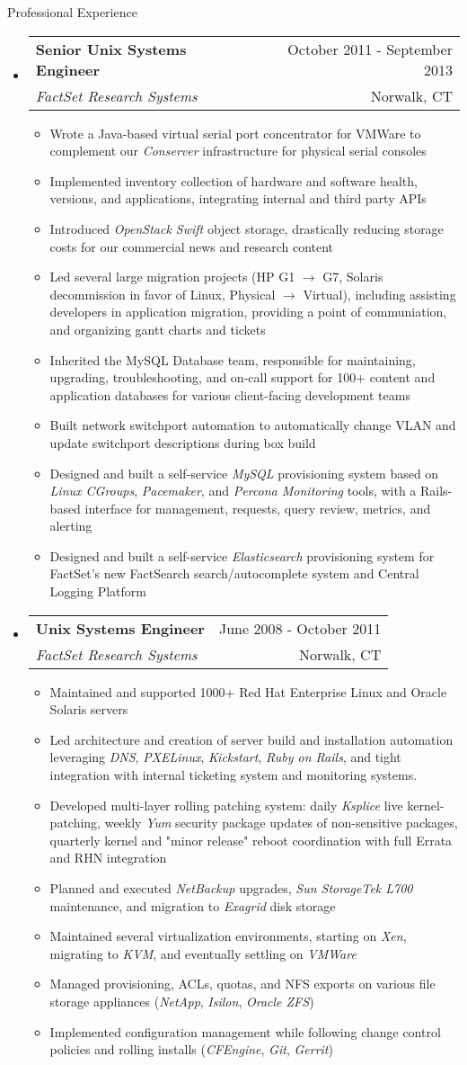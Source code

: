\documentclass[letterpaper,10pt]{article}
\makeatletter
\newenvironment{ressection}[1]{
	\vspace{4pt}
	{\fontfamily{phv}\selectfont\Large#1}
	\begin{itemize}
	\vspace{3pt}
}{
	\end{itemize}
}
\newcommand{\ressubitem}[1]{
	\vspace{-1pt}
	\item \begin{flushleft} #1 \end{flushleft}
}
\newcommand{\resbigitem}[4]{
	\vspace{-5pt}
	\item
	\begin{tabular*}{6in}{l@{\extracolsep{\fill}}r}
		\textbf{#1} & #2 \\
		\textit{#3} & #4\\
	\end{tabular*}
}
\newenvironment{ressubsec}[4]{
	\resbigitem{#1}{#2}{#3}{#4}
	\vspace{-2pt}
	\begin{itemize}
}{
	\end{itemize}
}
\makeatother
\begin{document}
\begin{ressection}{Professional Experience}
	\begin{ressubsec}{Senior Unix Systems Engineer}{October 2011 - September 2013}{FactSet Research Systems}{Norwalk, CT}
		\ressubitem{Wrote a Java-based virtual serial port concentrator for VMWare to complement our \textit{Conserver} infrastructure for physical serial consoles}
		\ressubitem{Implemented inventory collection of hardware and software health, versions, and applications, integrating internal and third party APIs}
		\ressubitem{Introduced \textit{OpenStack Swift} object storage, drastically reducing storage costs for our commercial news and research content}
		\ressubitem{Led several large migration projects (HP G1 $\rightarrow$ G7, Solaris decommission in favor of Linux, Physical $\rightarrow$ Virtual), including assisting developers in application migration, providing a point of communiation, and organizing gantt charts and tickets}
		\ressubitem{Inherited the MySQL Database team, responsible for maintaining, upgrading, troubleshooting, and on-call support for 100+ content and application databases for various client-facing development teams}
		\ressubitem{Built network switchport automation to automatically change VLAN and update switchport descriptions during box build}
		\ressubitem{Designed and built a self-service \textit{MySQL} provisioning system based on \textit{Linux CGroups}, \textit{Pacemaker}, and \textit{Percona Monitoring} tools, with a Rails-based interface for management, requests, query review, metrics, and alerting}
		\ressubitem{Designed and built a self-service \textit{Elasticsearch} provisioning system for FactSet's new FactSearch search/autocomplete system and Central Logging Platform}
	\end{ressubsec}

	\begin{ressubsec}{Unix Systems Engineer}{June 2008 - October 2011}{FactSet Research Systems}{Norwalk, CT}
		\ressubitem{Maintained and supported 1000+ Red Hat Enterprise Linux and Oracle Solaris servers}
		\ressubitem{Led architecture and creation of server build and installation automation leveraging \textit{DNS}, \textit{PXELinux}, \textit{Kickstart}, \textit{Ruby on Rails}, and tight integration with internal ticketing system and monitoring systems.}
		\ressubitem{Developed multi-layer rolling patching system: daily \textit{Ksplice} live kernel-patching, weekly \textit{Yum} security package updates of non-sensitive packages, quarterly kernel and "minor release" reboot coordination with full Errata and RHN integration}
		\ressubitem{Planned and executed \textit{NetBackup} upgrades, \textit{Sun StorageTek L700} maintenance, and migration to \textit{Exagrid} disk storage}
		\ressubitem{Maintained several virtualization environments, starting on \textit{Xen}, migrating to \textit{KVM}, and eventually settling on \textit{VMWare}}
		\ressubitem{Managed provisioning, ACLs, quotas, and NFS exports on various file storage appliances (\textit{NetApp}, \textit{Isilon}, \textit{Oracle ZFS})}
		\ressubitem{Implemented configuration management while following change control policies and rolling installs (\textit{CFEngine}, \textit{Git}, \textit{Gerrit})}
	\end{ressubsec}


\end{ressection}
\end{document}
